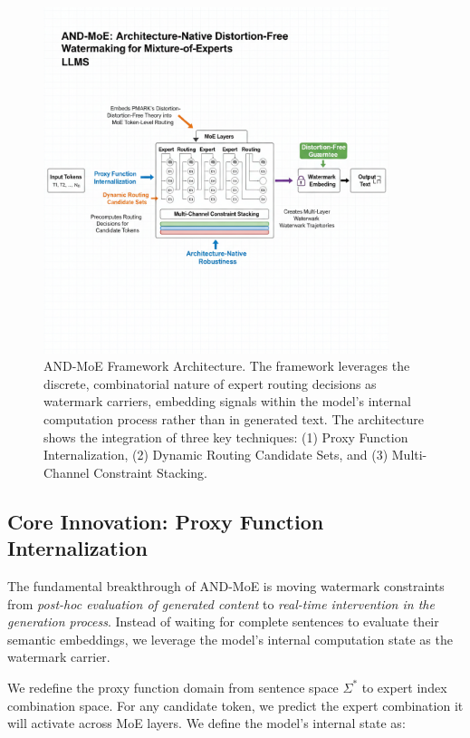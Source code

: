 \documentclass[letterpaper,twocolumn,10pt]{article}
\begin{document}
\begin{figure}[t]
\centering
\includegraphics[width=0.9\textwidth]{figs/AND-MoE-Arch.png}
\caption{AND-MoE Framework Architecture. The framework leverages the discrete, combinatorial nature of expert routing decisions as watermark carriers, embedding signals within the model's internal computation process rather than in generated text. The architecture shows the integration of three key techniques: (1) Proxy Function Internalization, (2) Dynamic Routing Candidate Sets, and (3) Multi-Channel Constraint Stacking.}
\label{fig:architecture}
\end{figure}

\subsection{Core Innovation: Proxy Function Internalization}

The fundamental breakthrough of AND-MoE is moving watermark constraints from \textit{post-hoc evaluation of generated content} to \textit{real-time intervention in the generation process}. Instead of waiting for complete sentences to evaluate their semantic embeddings, we leverage the model's internal computation state as the watermark carrier.

We redefine the proxy function domain from sentence space $\Sigma^*$ to expert index combination space. For any candidate token, we predict the expert combination it will activate across MoE layers. We define the model's internal state as:
\end{document}
